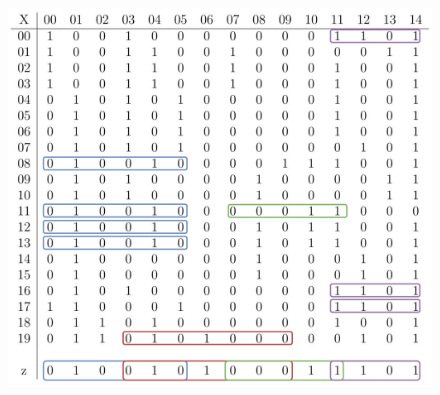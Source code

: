 \documentclass{beamer}
\begin{document}
\begin{frame}
  \begin{figure}[H]
    \centering
    \includegraphics[scale = 0.27]{img/match.pdf}
  \end{figure}
\end{frame}
\end{document}
